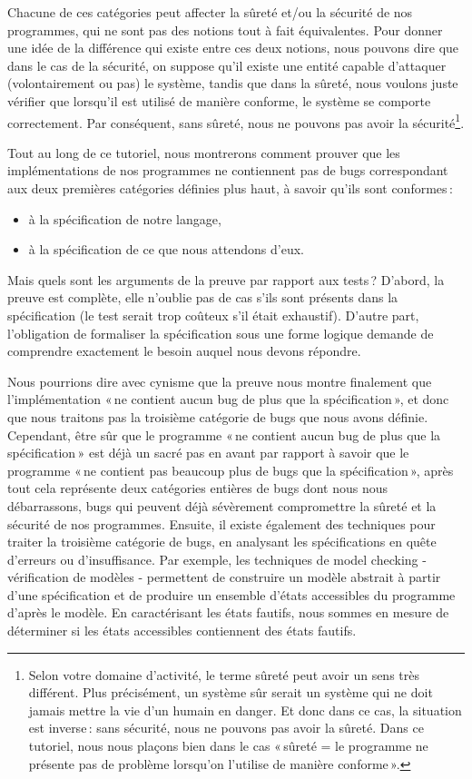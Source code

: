 Chacune de ces catégories peut affecter la sûreté et/ou la sécurité de nos
programmes, qui ne sont pas des notions tout à fait équivalentes. Pour donner
une idée de la différence qui existe entre ces deux notions, nous pouvons
dire que dans le cas de la sécurité, on suppose qu’il existe une entité
capable d’attaquer (volontairement ou pas) le système, tandis que dans la
sûreté, nous voulons juste vérifier que lorsqu’il est utilisé de manière
conforme, le système se comporte correctement. Par conséquent, sans sûreté,
nous ne pouvons pas avoir la sécurité\footnote{Selon votre domaine
d’activité, le terme sûreté peut avoir un sens très différent. Plus
précisément, un système sûr serait un système qui ne doit jamais mettre la
vie d’un humain en danger. Et donc dans ce cas, la situation est inverse :
sans sécurité, nous ne pouvons pas avoir la sûreté. Dans ce tutoriel, nous
nous plaçons bien dans le cas « sûreté = le programme ne présente pas de
problème lorsqu’on l’utilise de manière conforme ».}.


Tout au long de ce tutoriel, nous montrerons comment prouver que les
implémentations de nos programmes ne contiennent pas de bugs correspondant
aux deux premières catégories définies plus haut, à savoir qu’ils sont
conformes :


\begin{itemize}
\item à la spécification de notre langage,
\item à la spécification de ce que nous attendons d’eux.
\end{itemize}


Mais quels sont les arguments de la preuve par rapport aux tests ? D’abord,
la preuve est complète, elle n’oublie pas de cas s’ils sont présents dans la
spécification (le test serait trop coûteux s’il était exhaustif). D’autre
part, l’obligation de formaliser la spécification sous une forme logique
demande de comprendre exactement le besoin auquel nous devons répondre.

Nous pourrions dire avec cynisme que la preuve nous montre finalement que
l’implémentation « ne contient aucun bug de plus que la spécification », et
donc que nous traitons pas la troisième catégorie de bugs que nous avons
définie. Cependant, être sûr que le programme « ne contient aucun bug de
plus que la spécification » est déjà un sacré pas en avant par rapport à
savoir que le programme « ne contient pas beaucoup plus de bugs que la
spécification », après tout cela représente deux catégories entières de bugs
dont nous nous débarrassons, bugs qui peuvent déjà sévèrement compromettre la
sûreté et la sécurité de nos programmes. Ensuite, il existe également des
techniques pour traiter la troisième catégorie de bugs, en analysant les
spécifications en quête d’erreurs ou d’insuffisance. Par exemple, les
techniques de model checking - vérification de modèles - permettent de
construire un modèle abstrait à partir d’une spécification et de produire
un ensemble d’états accessibles du programme d’après le modèle. En
caractérisant les états fautifs, nous sommes en mesure de déterminer si les
états accessibles contiennent des états fautifs.


